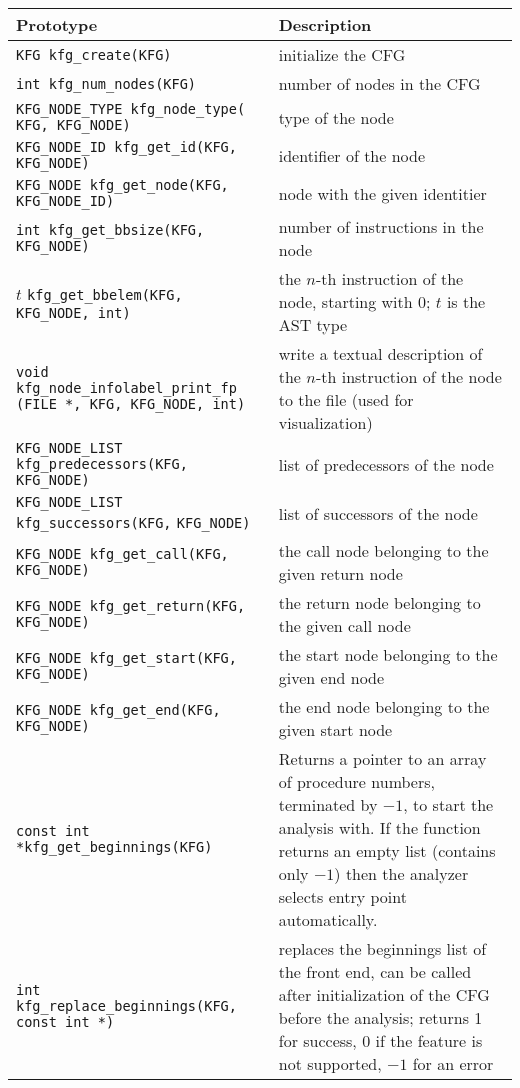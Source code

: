 \begin{longtable}{|p{} | p{}|}
\hline
Prototype & Description \\
\hline
\hline \endhead
\verb|KFG kfg_create(KFG)| & initialize the CFG \\
\hline
\verb|int kfg_num_nodes(KFG)| & number of nodes in the CFG \\
\hline
\verb|KFG_NODE_TYPE kfg_node_type(| \verb|KFG, KFG_NODE)|
    & type of the node \\
\hline
\verb|KFG_NODE_ID kfg_get_id(KFG,| \verb|KFG_NODE)|
    & identifier of the node \\
\hline
\verb|KFG_NODE kfg_get_node(KFG,| \verb|KFG_NODE_ID)|
    & node with the given identitier \\
\hline
\verb|int kfg_get_bbsize(KFG, | \verb|KFG_NODE)|
    & number of instructions in the node \\
\hline
\(t\) \verb|kfg_get_bbelem(KFG, KFG_NODE, int)|
    & the \(n\)-th instruction of the node, starting with 0; \(t\) is
      the AST type \\
\hline
\raggedright \verb|void kfg_node_infolabel_print_fp|
    \verb|(FILE *, KFG, KFG_NODE, int)|
    & write a textual description of the \(n\)-th instruction of the node
      to the file (used for visualization) \\
\hline
\verb|KFG_NODE_LIST kfg_predecessors(KFG,| \verb|KFG_NODE)|
    & list of predecessors of the node \\
\hline
\verb|KFG_NODE_LIST kfg_successors(KFG,| \verb|KFG_NODE)|
    & list of successors of the node \\
\hline
\verb|KFG_NODE kfg_get_call(KFG,| \verb|KFG_NODE)|
    & the call node belonging to the given return node \\
\hline
\verb|KFG_NODE kfg_get_return(KFG,| \verb|KFG_NODE)|
    & the return node belonging to the given call node \\
\hline
\verb|KFG_NODE kfg_get_start(KFG,| \verb|KFG_NODE)|
    & the start node belonging to the gi\-ven end node \\
\hline
\verb|KFG_NODE kfg_get_end(KFG, KFG_NODE)|
    & the end node belonging to the given start node \\
\hline
\verb|const int *kfg_get_beginnings(KFG)|
    & Returns a pointer to an array of procedure numbers, terminated by
      \(-1\), to start the analysis with. If the function returns an
      empty list (contains only \(-1\)) then the analyzer selects entry
      point automatically. \\
\hline
\verb|int kfg_replace_beginnings(KFG,| \verb|const int *)|
    & replaces the beginnings list of the front end, can be called after
      initialization of the CFG before the analysis; returns 1 for
      success, 0 if the feature is not supported, \(-1\) for an error \\
\hline
\end{longtable}

